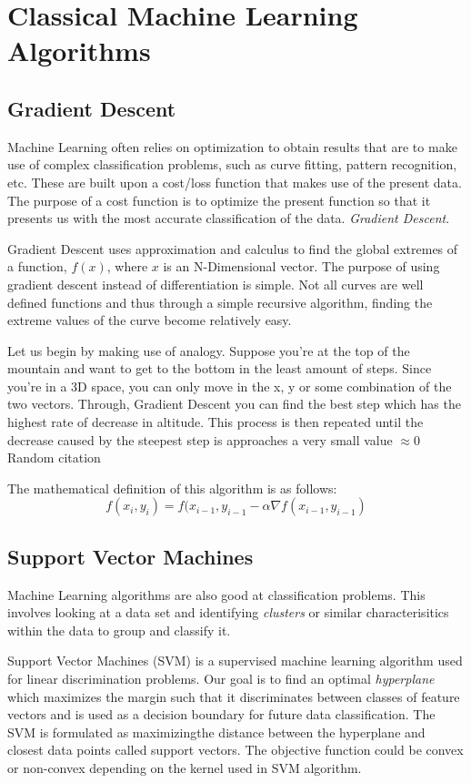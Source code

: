 \documentclass{article}
\begin{document}
\section{Classical Machine Learning Algorithms}
\subsection{Gradient Descent}
\par
	Machine Learning often relies on optimization to obtain results that are to make use of complex classification problems, such as curve fitting, pattern recognition, etc. These are built upon a cost/loss function that makes use of the present data. The purpose of a cost function is to optimize the present function so that it presents us with the most accurate classification of the data. \textit{Gradient Descent}.
	\par
	Gradient Descent uses approximation and calculus to find the global extremes of a function, $f(x)$, where $x$ is an N-Dimensional vector. The purpose of using gradient descent instead of differentiation is simple. Not all curves are well defined functions and thus through a simple recursive algorithm, finding the extreme values of the curve become relatively easy. 
	\par
	Let us begin by making use of analogy. Suppose you're at the top of the mountain and want to get to the bottom in the least amount of steps. Since you're in a 3D space, you can only move in the x, y or some combination of the two vectors. Through, Gradient Descent you can find the best step which has the highest rate of decrease in altitude. This process is then repeated until the decrease caused by the steepest step is approaches a very small value $\approx 0$ Random citation \cite{BOOK:1} 
	\par
	[12] The mathematical definition of this algorithm is as follows:  
	$$f(x_i, y_i) = f(x_{i-1}, y_{i-1} - \alpha\nabla f(x_{i-1}, y_{i-1})$$


\subsection{Support Vector Machines}
\par    
Machine Learning algorithms are also good at classification problems. This involves looking at a data set and identifying \textit{clusters} or similar characterisitics within the data to group and classify it.
	\par
	Support Vector Machines (SVM) is a supervised machine learning algorithm used for linear discrimination problems. Our goal is to find an optimal \textit{hyperplane} which maximizes the margin such that it discriminates between classes of feature vectors and is used as a decision boundary for future data classification. The SVM is formulated as maximizingthe distance between the hyperplane and closest data points called support vectors. The objective function could be convex or non-convex depending on the kernel used in SVM algorithm.\cite {BOOK:1}
\end{document}

